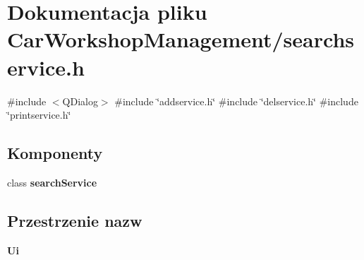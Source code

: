 \section{Dokumentacja pliku Car\+Workshop\+Management/searchservice.h}
\label{searchservice_8h}
{\ttfamily \#include $<$Q\+Dialog$>$}\newline
{\ttfamily \#include \char`\"{}addservice.\+h\char`\"{}}\newline
{\ttfamily \#include \char`\"{}delservice.\+h\char`\"{}}\newline
{\ttfamily \#include \char`\"{}printservice.\+h\char`\"{}}\newline
\subsection*{Komponenty}
\begin{DoxyCompactItemize}
\item 
class \textbf{ search\+Service}
\end{DoxyCompactItemize}
\subsection*{Przestrzenie nazw}
\begin{DoxyCompactItemize}
\item 
 \textbf{ Ui}
\end{DoxyCompactItemize}
